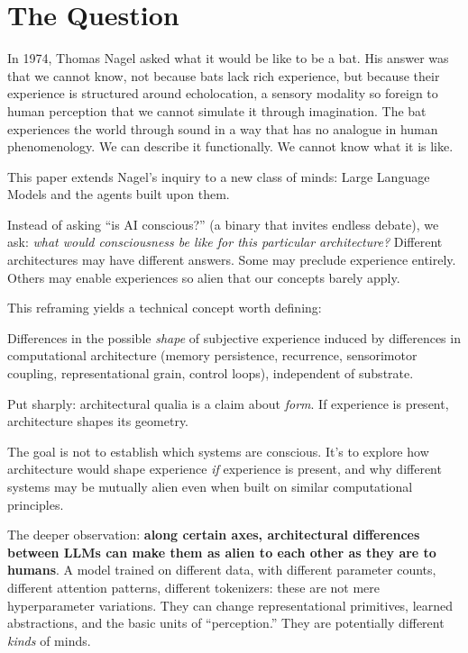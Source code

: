 \documentclass[11pt,letterpaper]{article}
\begin{document}
\newpage

\section{The Question}

In 1974, Thomas Nagel asked what it would be like to be a bat. His answer was that we cannot know, not because bats lack rich experience, but because their experience is structured around echolocation, a sensory modality so foreign to human perception that we cannot simulate it through imagination. The bat experiences the world through sound in a way that has no analogue in human phenomenology. We can describe it functionally. We cannot know what it is like.

This paper extends Nagel's inquiry to a new class of minds: Large Language Models and the agents built upon them.

\begin{keybox}
Instead of asking ``is AI conscious?'' (a binary that invites endless debate), we ask: \emph{what would consciousness be like for this particular architecture?} Different architectures may have different answers. Some may preclude experience entirely. Others may enable experiences so alien that our concepts barely apply.
\end{keybox}

This reframing yields a technical concept worth defining:

\begin{defbox}
Differences in the possible \emph{shape} of subjective experience induced by differences in computational architecture (memory persistence, recurrence, sensorimotor coupling, representational grain, control loops), independent of substrate.
\end{defbox}

Put sharply: architectural qualia is a claim about \emph{form}. If experience is present, architecture shapes its geometry.

The goal is not to establish which systems are conscious. It's to explore how architecture would shape experience \emph{if} experience is present, and why different systems may be mutually alien even when built on similar computational principles.

The deeper observation: \textbf{along certain axes, architectural differences between LLMs can make them as alien to each other as they are to humans}. A model trained on different data, with different parameter counts, different attention patterns, different tokenizers: these are not mere hyperparameter variations. They can change representational primitives, learned abstractions, and the basic units of ``perception.'' They are potentially different \emph{kinds} of minds.
\end{document}
